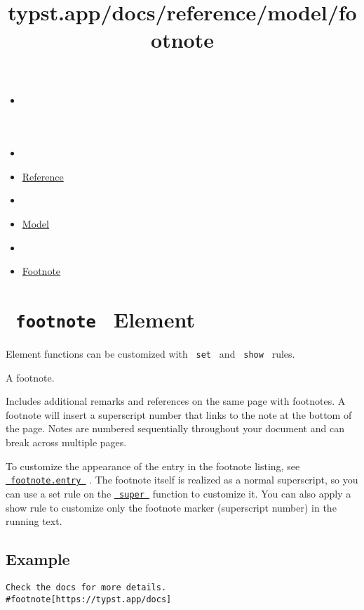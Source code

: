 \title{typst.app/docs/reference/model/footnote}

\begin{itemize}
\tightlist
\item
  \href{/docs}{}
\item
  
\item
  \href{/docs/reference/}{Reference}
\item
  
\item
  \href{/docs/reference/model/}{Model}
\item
  
\item
  \href{/docs/reference/model/footnote/}{Footnote}
\end{itemize}

\section{\texorpdfstring{\texttt{\ footnote\ } {{ Element
}}}{ footnote   Element }}\label{summary}

\label{element-tooltip}
Element functions can be customized with \texttt{\ set\ } and
\texttt{\ show\ } rules.

A footnote.

Includes additional remarks and references on the same page with
footnotes. A footnote will insert a superscript number that links to the
note at the bottom of the page. Notes are numbered sequentially
throughout your document and can break across multiple pages.

To customize the appearance of the entry in the footnote listing, see
\href{/docs/reference/model/footnote/\#definitions-entry}{\texttt{\ footnote.entry\ }}
. The footnote itself is realized as a normal superscript, so you can
use a set rule on the
\href{/docs/reference/text/super/}{\texttt{\ super\ }} function to
customize it. You can also apply a show rule to customize only the
footnote marker (superscript number) in the running text.

\subsection{Example}\label{example}

\begin{verbatim}
Check the docs for more details.
#footnote[https://typst.app/docs]
\end{verbatim}

